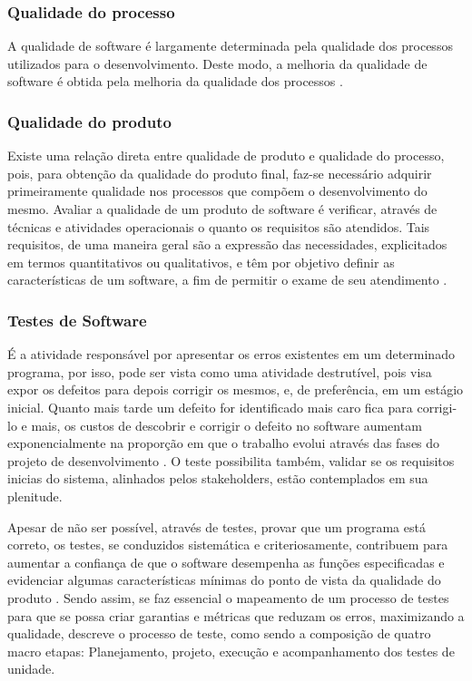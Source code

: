 \documentclass[12pt]{article}
\begin{document}
	
	\subsubsection{Qualidade do processo}
	
	A qualidade de software é largamente determinada pela qualidade dos processos utilizados para o desenvolvimento. Deste modo, a melhoria 
	da qualidade de software é obtida pela melhoria da qualidade dos processos \cite{koscianski2007qualidade}. 
	
	\subsubsection{Qualidade do produto}

	Existe uma relação direta entre qualidade de produto e qualidade do processo, pois, para obtenção da qualidade do produto final,
	faz-se necessário adquirir primeiramente qualidade nos processos que compõem o desenvolvimento do mesmo.
	Avaliar a qualidade de um produto de software é verificar, através de técnicas e atividades operacionais o quanto os requisitos são atendidos. Tais requisitos,
	de uma maneira geral são a expressão das necessidades, explicitados em termos quantitativos ou qualitativos, e têm por objetivo definir as características de
	um software, a fim de permitir o exame de seu atendimento \cite{koscianski2007qualidade}.
	
	\subsubsection{Testes de Software}

	É a atividade responsável por apresentar os erros existentes em um determinado programa, por isso, pode ser vista como uma atividade destrutível, pois visa expor os defeitos para depois corrigir os mesmos, e, de preferência, em um estágio inicial. Quanto mais tarde um defeito for identificado mais caro fica para corrigi-lo e mais, os custos de descobrir e corrigir o defeito no software aumentam exponencialmente na proporção em que o trabalho evolui através das fases do projeto de desenvolvimento \cite{boehm1976quantitative}. O teste possibilita também, validar se os requisitos inicias do sistema, alinhados pelos stakeholders, estão contemplados em sua plenitude.

	Apesar de não ser possível, através de testes, provar que um programa está correto, os testes, se conduzidos sistemática e criteriosamente, contribuem para aumentar a confiança de que o software desempenha as funções especificadas e evidenciar algumas características mínimas do ponto de vista da qualidade do produto \cite{maldonado2004introduccao}. Sendo assim, se faz essencial o mapeamento de um processo de testes para que se possa criar garantias e métricas que reduzam os erros, maximizando a qualidade, \citeauthor{crespo2004metodologia} \cite{crespo2004metodologia} descreve o processo de teste, como sendo a composição de quatro macro etapas: Planejamento, projeto, execução e acompanhamento dos testes de unidade.
\end{document}
